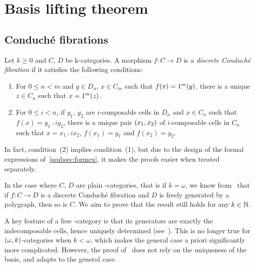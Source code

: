 \section{Basis lifting theorem}\label{sec:basislift}

\subsection{Conduché fibrations}\label{subsec:conduche}
\begin{paragr}
  Let $k\geq 0$ and $C$, $D$ be \ook k-categories. A morphism $f:C\to D$ is a {\em discrete Conduché fibration} if it satisfies the following conditions:
  \begin{enumerate}
  \item For $0\leq n<m$ and  $y\in D_n$,  $x\in C_m$ such that $f(x)=1^{m}(y)$, there is a unique $z\in C_n$ such that $x=1^{m}(z)$.
    \item For $0\leq i<n$, if $y_1$, $y_2$ are $i$-composable cells in
      $D_n$ and $x\in C_n$ such that $f(x)=y_1\comp i y_2$, there is a unique pair $(x_1,x_2)$ of $i$-composable cells in $C_n$ such that $x=x_1\comp i x_2$, $f(x_1)=y_1$ and $f(x_2)=y_2$.
    \end{enumerate}
  \end{paragr}
  \begin{remark}
    In fact, condition~(2) implies condition~(1), but due to the
    design of the formal expressions of~\ref{ssubsec:formex}, it makes the
    proofs easier when treated separately.
  \end{remark}
\begin{paragr}  
In the case where $C$, $D$ are plain \oo-categories, that is if
$k=\omega$, we know from~\cite[Theorem 6.11]{guetta:poldcf} that if
$f:C\to D$ is a discrete Conduché fibration and $D$ is freely
generated by a polygraph, then so is $C$. We aim to prove that the
result still holds for any $k\in\mathbb N$.
  \end{paragr}
  \begin{remark}
     A key feature of a free \oo-category is that its generators are
     exactly the indecomposable cells, hence uniquely determined
     (see~\cite[Section 4, Proposition 8.3]{makkai:worcom}). This is
     no longer true for $(\omega,k)$-categories when $k<\omega$, which makes the general case a
     priori significantly more complicated. However, the proof
     of~\cite[Theorem 6.11]{guetta:poldcf} does not rely on the
     uniqueness of the basis, and adapts to the general case.
  \end{remark}
    

